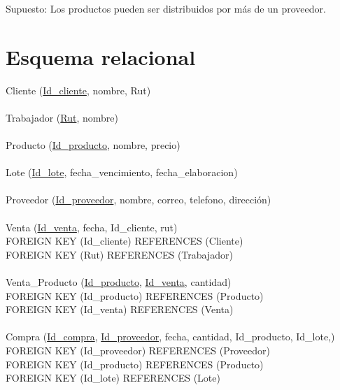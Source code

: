 \documentclass[12pt]{article}
\begin{document}
Supuesto: Los productos pueden ser distribuidos por m\'as de un proveedor.

	\newpage
	\section{Esquema relacional}
	Cliente (\underline{Id\_cliente}, nombre, Rut)\\\\
Trabajador (\underline{Rut}, nombre)\\\\
Producto (\underline{Id\_producto}, nombre, precio)\\\\
Lote (\underline{Id\_lote}, fecha\_vencimiento, fecha\_elaboracion)\\\\
Proveedor (\underline{Id\_proveedor}, nombre, correo, telefono, direcci\'on) \\\\
Venta (\underline{Id\_venta}, fecha, Id\_cliente, rut)\\
FOREIGN KEY (Id\_cliente) REFERENCES (Cliente)\\
FOREIGN KEY (Rut) REFERENCES (Trabajador)\\\\
Venta\_Producto (\underline{Id\_producto}, \underline{Id\_venta}, cantidad)\\
FOREIGN KEY (Id\_producto) REFERENCES (Producto)\\
FOREIGN KEY (Id\_venta) REFERENCES (Venta)\\\\
Compra (\underline{Id\_compra}, \underline{Id\_proveedor},  fecha, cantidad, Id\_producto, Id\_lote,)\\
FOREIGN KEY (Id\_proveedor) REFERENCES (Proveedor)\\
FOREIGN KEY (Id\_producto) REFERENCES (Producto)\\
FOREIGN KEY (Id\_lote) REFERENCES (Lote)\\

	\newpage
\end{document}
